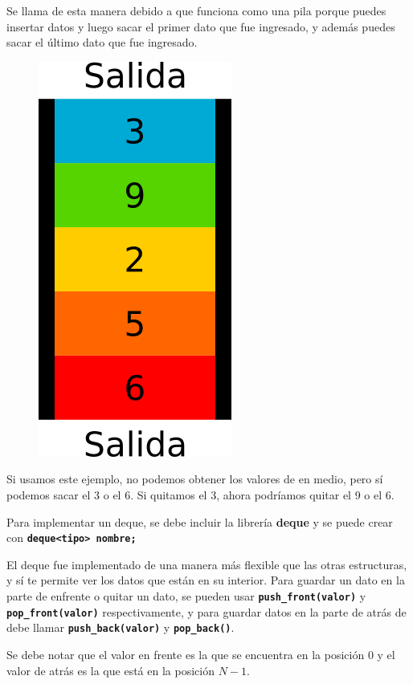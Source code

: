 \documentclass{article}
\begin{document}
Se llama de esta manera debido a que funciona como una pila porque puedes insertar datos y luego sacar el primer dato que fue ingresado, y además puedes sacar el último dato que fue ingresado.

\begin{figure}[H]
    \centering
    \includegraphics[width=0.1\paperwidth]{deque}
\end{figure}

Si usamos este ejemplo, no podemos obtener los valores de en medio, pero sí podemos sacar el 3 o el 6. Si quitamos el 3, ahora podríamos quitar el 9 o el 6.

Para implementar un deque, se debe incluir la librería \textbf{deque} y se puede crear con \textbf{\lstinline{deque<tipo> nombre;}}

El deque fue implementado de una manera más flexible que las otras estructuras, y sí te permite ver los datos que están en su interior. Para guardar un dato en la parte de enfrente o quitar un dato, se pueden usar \textbf{\lstinline{push_front(valor)}} y \textbf{\lstinline{pop_front(valor)}} respectivamente, y para guardar datos en la parte de atrás de debe llamar \textbf{\lstinline{push_back(valor)}} y \textbf{\lstinline{pop_back()}}.

Se debe notar que el valor en frente es la que se encuentra en la posición 0 y el valor de atrás es la que está en la posición $N - 1$.
\end{document}
